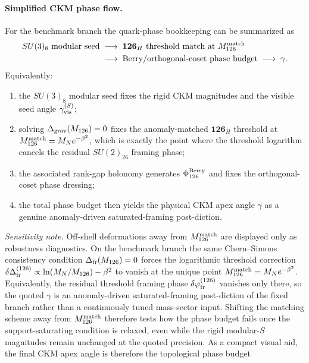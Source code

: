 \documentclass[11pt]{article}
\begin{document}
\paragraph{Simplified CKM phase flow.}
For the benchmark branch the quark-phase bookkeeping can be summarized as
\begin{equation}
 \begin{aligned}
  SU(3)_8\ \text{modular seed}
  &\;\longrightarrow\;
  \mathbf{126}_H\ \text{threshold match at }M_{126}^{\rm match}\\
  &\;\longrightarrow\;
  \text{Berry/orthogonal-coset phase budget}
  \;\longrightarrow\;
  \gamma.
 \end{aligned}
\end{equation}
Equivalently:
\begin{enumerate}
 \item the $SU(3)_8$ modular seed fixes the rigid CKM magnitudes and the visible seed angle $\gamma_{\rm vis}^{(S)}$;
 \item solving $\Delta_{\rm grav}(M_{126})=0$ fixes the anomaly-matched $\mathbf{126}_H$ threshold at $M_{126}^{\rm match}=M_Ne^{-\beta^2}$, which is exactly the point where the threshold logarithm cancels the residual $SU(2)_{26}$ framing phase;
 \item the associated rank-gap holonomy generates $\Phi_{126}^{\rm Berry}$ and fixes the orthogonal-coset phase dressing;
 \item the total phase budget then yields the physical CKM apex angle $\gamma$ as a genuine anomaly-driven saturated-framing post-diction.
\end{enumerate}
\noindent\textit{Sensitivity note.} Off-shell deformations away from
$M_{126}^{\rm match}$ are displayed only as robustness diagnostics. On the
benchmark branch the same Chern--Simons consistency condition
$\Delta_{\rm fr}(M_{126})=0$ forces the logarithmic threshold correction
$\delta\Delta_{\rm fr}^{(126)}\propto\ln(M_N/M_{126})-\beta^2$ to vanish at the
unique point $M_{126}^{\rm match}=M_Ne^{-\beta^2}$. Equivalently, the residual
threshold framing phase $\delta\varphi_{\rm fr}^{(126)}$ vanishes only there, so
the quoted $\gamma$ is an anomaly-driven saturated-framing post-diction of the
fixed branch rather than a continuously tuned mass-sector input. Shifting the
matching scheme away from $M_{126}^{\rm match}$ therefore tests how the phase
budget fails once the support-saturating condition is relaxed, even while the
rigid modular-$S$ magnitudes remain unchanged at the quoted precision.
As a compact visual aid, the final CKM apex angle is therefore the topological phase budget
\end{document}
